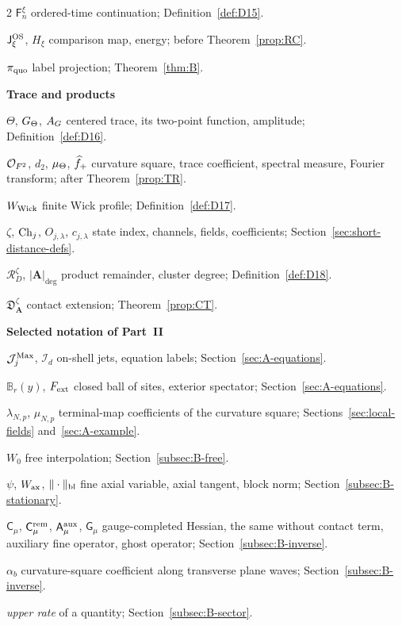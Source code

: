 \begin{multicols}{2}
$\mathsf F_n^\xi$ ordered-time continuation; Definition~\ref{def:D15}.

$\mathsf J_\xi^{\rm OS}$, $H_\xi$ comparison map, energy; before Theorem~\ref{prop:RC}.

$\pi_{\rm quo}$ label projection; Theorem~\ref{thm:B}.

\medskip\textbf{Trace and products}\par
$\Theta$, $G_{\Theta}$, $A_G$ centered trace, its two-point function, amplitude; Definition~\ref{def:D16}.

$\mathcal{O}_{F^2}$, $d_2$, $\mu_{\Theta}$, $\widehat{f}_{+}$ curvature square, trace coefficient, spectral measure, Fourier transform; after Theorem~\ref{prop:TR}.

$W_{\rm Wick}$ finite Wick profile; Definition~\ref{def:D17}.

$\zeta$, $\mathrm{Ch}_{j}$, $O_{j,\lambda}$, $c_{j,\lambda}$ state index, channels, fields, coefficients; Section~\ref{sec:short-distance-defs}.

$\mathcal R_D^\zeta$, $|\boldsymbol A|_{\deg}$ product remainder, cluster degree; Definition~\ref{def:D18}.

$\mathfrak D_{\boldsymbol A}^\zeta$ contact extension; Theorem~\ref{prop:CT}.

\medskip\textbf{Selected notation of Part~II}\par
$\mathcal J^{\rm Max}_j$, $\mathcal I_d$ on-shell jets, equation labels; Section~\ref{sec:A-equations}.

$\mathbb B_r(y)$, $F_{\rm ext}$ closed ball of sites, exterior spectator; Section~\ref{sec:A-equations}.

$\lambda_{N,p}$, $\mu_{N,p}$ terminal-map coefficients of the curvature square; Sections~\ref{sec:local-fields} and~\ref{sec:A-example}.

$W_0$ free interpolation; Section~\ref{subsec:B-free}.

$\psi$, $W_{\rm ax}$, $\|\cdot\|_{\rm bl}$ fine axial variable, axial tangent, block norm; Section~\ref{subsec:B-stationary}.

$\mathsf C_\mu$, $\mathsf C^{\rm rem}_\mu$, $\mathsf A^{\rm aux}_\mu$, $\mathsf G_\mu$ gauge-completed Hessian, the same without contact term, auxiliary fine operator, ghost operator; Section~\ref{subsec:B-inverse}.

$\alpha_b$ curvature-square coefficient along transverse plane waves; Section~\ref{subsec:B-inverse}.

\emph{upper rate} of a quantity; Section~\ref{subsec:B-sector}.


\end{multicols}
